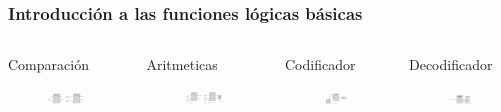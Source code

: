 \documentclass[10.5pt,scale=1.0,t,aspectratio=169,hyperref={pdfpagelabels=false}]{beamer}
\begin{document}
\begin{frame}
	\frametitle{Introducción a las funciones lógicas básicas}
		\begin{columns}
	\begin{block}{\small Comparación}
		\justifying
		\vspace{-0.1in}
		\begin{figure}
			\centering
			\includegraphics[width=6cm]{FuncionComparador}
		\end{figure}
	\end{block}
	
	\begin{block}{\small Aritmeticas}
		\justifying
		\vspace{-0.1in}
		\begin{figure}
			\centering
			\includegraphics[width=6cm]{FuncionSuma}
		\end{figure}
	\end{block}
	
	
	\begin{block}{\small Codificador}
		\justifying
		\vspace{-0.1in}
		\begin{figure}
			\centering
			\includegraphics[width=5cm]{FuncionCodificador}
		\end{figure}
	\end{block}
	
	\begin{block}{\small Decodificador}
		\justifying
		\vspace{-0.1in}
		\begin{figure}
			\centering
			\includegraphics[width=5cm]{FuncionDecodificador}
		\end{figure}
	\end{block}
\end{columns}
\end{frame}
\end{document}
